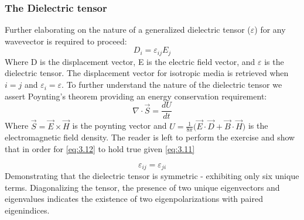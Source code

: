 \subsubsection{The Dielectric tensor}
Further elaborating on the nature of a generalized dielectric tensor ($\varepsilon$) for any wavevector is required to proceed:
\begin{equation}\label{eq:3.11}
D_i = \varepsilon_{ij}E_j
\end{equation}
Where D is the displacement vector, E is the electric field vector, and $\varepsilon$ is the dielectric tensor. The displacement vector for isotropic media is retrieved when $i = j$ and $\varepsilon_i = \varepsilon$. To further understand the nature of the dielectric tensor we assert Poynting's theorem providing an energy conservation requirement:
\begin{equation}\label{eq:3.12}
\nabla \cdot \vec{S} = \frac{dU}{dt}
\end{equation}
Where $\vec{S} = \vec{E} \times \vec{H}$ is the poynting vector and $U = \frac{1}{8 \pi} \big( \vec{E} \cdot \vec{D} + \vec{B} \cdot \vec{H} \big)$ is the electromagnetic field density. The reader is left to perform the exercise and show that in order for \ref{eq:3.12} to hold true given \ref{eq:3.11}


\begin{equation}
\varepsilon_{ij} = \varepsilon_{ji}
\end{equation}
Demonstrating that the dielectric tensor is symmetric - exhibiting only six unique terms. Diagonalizing the tensor, the presence of two unique eigenvectors and eigenvalues indicates the existence of two eigenpolarizations with paired eigenindices.


